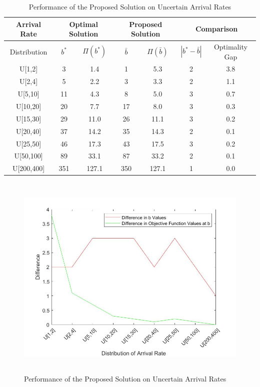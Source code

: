 \begin{center}
\begin{table}[hbt!]
            \begin{tabular}{|c||c|c|c|c|c|c|}
            \hline
            Arrival Rate &  \multicolumn{2}{|c|}{Optimal Solution} & \multicolumn{2}{|c|}{Proposed Solution}& \multicolumn{2}{|c|}{Comparison} \\
            \hline
                Distribution& $b^*$ & $\Pi(b^*)$ & $\bar{b}$& $\Pi(\bar{b})$& $|b^*-\bar{b}|$& Optimality Gap\\ 
                    \hline \hline
                    U[1,2] & 3 & 1.4 & 1 & 5.3 & 2& 3.8\\ 
                    U[2,4] & 5 & 2.2 & 3 & 3.3 & 2& 1.1\\
                    U[5,10] & 11 & 4.3 & 8 & 5.0 & 3& 0.7\\
                    U[10,20] & 20 & 7.7 & 17 & 8.0 & 3& 0.3\\
                    U[15,30] & 29 & 11.0 & 26 & 11.1 & 3& 0.2\\
                    U[20,40] & 37 & 14.2 & 35 & 14.3 & 2& 0.1\\
                    U[25,50] & 46 & 17.3 & 43 & 17.5 & 3& 0.2\\
                    U[50,100] & 89 & 33.1 & 87 & 33.2 & 2& 0.1\\
                    U[200,400] & 351 & 127.1 & 350 & 127.1 & 1& 0.0\\
            \hline
            \end{tabular} 
            \caption{Performance of the Proposed Solution on Uncertain Arrival Rates}            
\end{table}

\begin{figure}[hbt!]
\includegraphics[height=10cm]{correctedUni.jpg}
\caption{Performance of the Proposed Solution on Uncertain Arrival Rates}
\end{figure}

\end{center}
